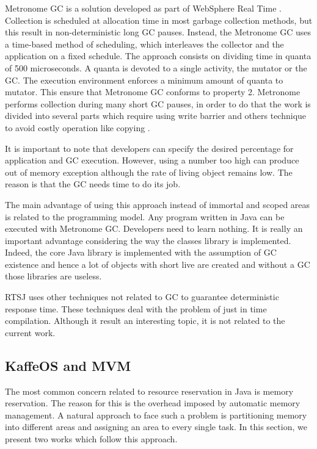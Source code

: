 Metronome GC is a solution developed as part of WebSphere Real Time \cite{Bacon03themetronome:}.
Collection is scheduled at allocation time in most garbage collection methods, but this result in non-deterministic long GC pauses.
Instead, the Metronome GC uses a time-based method of scheduling, which interleaves the collector and the application on a fixed schedule.
The approach consists on dividing time in quanta of 500 microseconds.
A quanta is devoted to a single activity, the mutator or the GC.
The execution environment enforces a minimum amount of quanta to mutator.
This ensure that Metronome GC conforms to property 2.
Metronome performs collection during many short GC pauses, in order to do that the work is divided into several parts which require using write barrier and others technique to avoid costly operation like copying \cite{Bacon03themetronome:}.

It is important to note that developers can specify the desired percentage for application and GC execution.
However, using a number too high can produce out of memory exception although the rate of living object remains low. The reason is that the GC needs time to do its job.

The main advantage of using this approach instead of immortal and scoped areas is related to the programming model.
Any program written in Java can be executed with Metronome GC.
Developers need to learn nothing.
It is really an important advantage considering the way the classes library is implemented.
Indeed, the core Java library is implemented with the assumption of GC existence and hence a lot of objects with short live are created and without a GC those libraries are useless.

RTSJ uses other techniques not related to GC to guarantee deterministic response time. These techniques deal with the problem of just in time compilation. Although it result an interesting topic, it is not related to the current work. 


\subsection{KaffeOS and MVM}
The most common concern related to resource reservation in Java is memory reservation.
The reason for this is the overhead imposed by automatic memory management.
A natural approach to face such a problem is partitioning memory into different areas and assigning an area to every single task.
In this section, we present two works which follow this approach.

